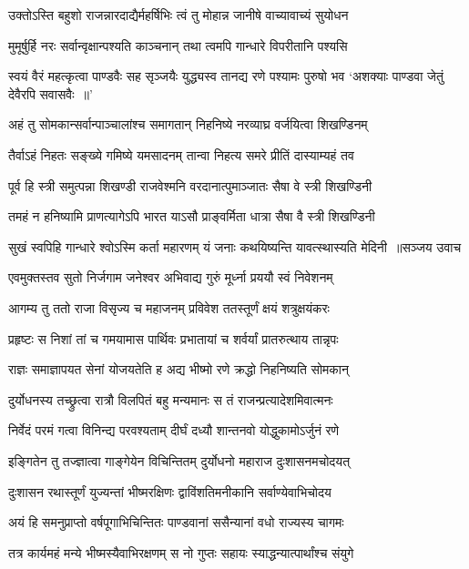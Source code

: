 \twolineshloka
{उक्तोऽस्ति बहुशो राजन्नारदाद्यैर्महर्षिभिः}
{त्वं तु मोहान्न जानीषे वाच्यावाच्यं सुयोधन}


\twolineshloka
{मुमूर्षुर्हि नरः सर्वान्वृक्षान्पश्यति काञ्चनान्}
{तथा त्वमपि गान्धारे विपरीतानि पश्यसि}


\threelineshloka
{स्वयं वैरं महत्कृत्वा पाण्डवैः सह सृञ्जयैः}
{युद्ध्यस्व तानद्य रणे पश्यामः पुरुषो भव}
{`अशक्याः पाण्डवा जेतुं देवैरपि सवासवैः ॥'}


\twolineshloka
{अहं तु सोमकान्सर्वान्पाञ्चालांश्च समागतान्}
{निहनिष्ये नरव्याघ्र वर्जयित्वा शिखण्डिनम्}


\twolineshloka
{तैर्वाऽहं निहतः सङ्ख्ये गमिष्ये यमसादनम्}
{तान्वा निहत्य समरे प्रीतिं दास्याम्यहं तव}


\twolineshloka
{पूर्व हि स्त्री समुत्पन्ना शिखण्डी राजवेश्मनि}
{वरदानात्पुमाञ्जातः सैषा वे स्त्री शिखण्डिनी}


\twolineshloka
{तमहं न हनिष्यामि प्राणत्यागेऽपि भारत}
{याऽसौ प्राङ्वर्मिता धात्रा सैषा वै स्त्री शिखण्डिनी}


\threelineshloka
{सुखं स्वपिहि गान्धारे श्वोऽस्मि कर्ता महारणम्}
{यं जनाः कथयिष्यन्ति यावत्स्थास्यति मेदिनी ॥सञ्जय उवाच}
{}


\twolineshloka
{एवमुक्तस्तव सुतो निर्जगाम जनेश्वर}
{अभिवाद्य गुरुं मूर्ध्ना प्रययौ स्वं निवेशनम्}


\twolineshloka
{आगम्य तु ततो राजा विसृज्य च महाजनम्}
{प्रविवेश ततस्तूर्णं क्षयं शत्रुक्षयंकरः}


\twolineshloka
{प्रहृष्टः स निशां तां च गमयामास पार्थिवः}
{प्रभातायां च शर्वर्यां प्रातरुत्थाय तान्नृपः}


\twolineshloka
{राज्ञः समाज्ञापयत सेनां योजयतेति ह}
{अद्य भीष्मो रणे क्रद्धो निहनिष्यति सोमकान्}


\twolineshloka
{दुर्योधनस्य तच्छ्रुत्वा रात्रौ विलपितं बहु}
{मन्यमानः स तं राजन्प्रत्यादेशमिवात्मनः}


\twolineshloka
{निर्वेदं परमं गत्वा विनिन्द्य परवश्यताम्}
{दीर्घं दध्यौ शान्तनवो योद्धुकामोऽर्जुनं रणे}


\twolineshloka
{इङ्गितेन तु तज्ज्ञात्वा गाङ्गेयेन विचिन्तितम्}
{दुर्योधनो महाराज दुःशासनमचोदयत्}


\twolineshloka
{दुःशासन रथास्तूर्णं युज्यन्तां भीष्मरक्षिणः}
{द्वाविंशतिमनीकानि सर्वाण्येवाभिचोदय}


\twolineshloka
{अयं हि समनुप्राप्तो वर्षपूगाभिचिन्तितः}
{पाण्डवानां ससैन्यानां वधो राज्यस्य चागमः}


\twolineshloka
{तत्र कार्यमहं मन्ये भीष्मस्यैवाभिरक्षणम्}
{स नो गुप्तः सहायः स्याद्धन्यात्पार्थांश्च संयुगे}


